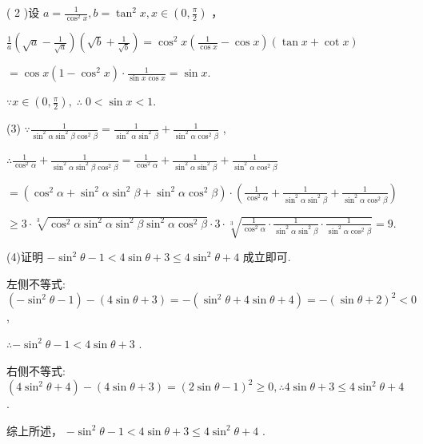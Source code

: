 \documentclass[10pt]{article}
\begin{document}
( 2 )设 \(a = \frac{1}{{\cos }^{2}x},b = {\tan }^{2}x,x \in  \left( {0,\frac{\pi }{2}}\right)\) ，

\(\frac{1}{a}\left( {\sqrt{a} - \frac{1}{\sqrt{a}}}\right) \left( {\sqrt{b} + \frac{1}{\sqrt{b}}}\right)  = {\cos }^{2}x\left( {\frac{1}{\cos x} - \cos x}\right) \left( {\tan x + \cot x}\right)\)

\(= \cos x\left( {1 - {\cos }^{2}x}\right)  \cdot  \frac{1}{\sin x\cos x} = \sin x.\)

\(\because x \in  \left( {0,\frac{\pi }{2}}\right) ,\;\therefore \;0 < \sin x < 1.\)

(3) \(\because \frac{1}{{\sin }^{2}\alpha {\sin }^{2}\beta {\cos }^{2}\beta } = \frac{1}{{\sin }^{2}\alpha {\sin }^{2}\beta } + \frac{1}{{\sin }^{2}\alpha {\cos }^{2}\beta }\) ,

\(\therefore \frac{1}{{\cos }^{2}\alpha } + \frac{1}{{\sin }^{2}\alpha {\sin }^{2}\beta {\cos }^{2}\beta } = \frac{1}{{\cos }^{2}\alpha } + \frac{1}{{\sin }^{2}\alpha {\sin }^{2}\beta } + \frac{1}{{\sin }^{2}\alpha {\cos }^{2}\beta }\)

\(= \left( {{\cos }^{2}\alpha  + {\sin }^{2}\alpha {\sin }^{2}\beta  + {\sin }^{2}\alpha {\cos }^{2}\beta }\right)  \cdot  \left( {\frac{1}{{\cos }^{2}\alpha } + \frac{1}{{\sin }^{2}\alpha {\sin }^{2}\beta } + \frac{1}{{\sin }^{2}\alpha {\cos }^{2}\beta }}\right)\)

\(\geq  3 \cdot  \sqrt[3]{{\cos }^{2}\alpha {\sin }^{2}\alpha {\sin }^{2}\beta {\sin }^{2}\alpha {\cos }^{2}\beta } \cdot  3 \cdot  \sqrt[3]{\frac{1}{{\cos }^{2}\alpha } \cdot  \frac{1}{{\sin }^{2}\alpha {\sin }^{2}\beta } \cdot  \frac{1}{{\sin }^{2}\alpha {\cos }^{2}\beta }} = 9.\)

(4)证明 \(- {\sin }^{2}\theta  - 1 < 4\sin \theta  + 3 \leq  4{\sin }^{2}\theta  + 4\) 成立即可.

左侧不等式: \(\left( {-{\sin }^{2}\theta  - 1}\right)  - \left( {4\sin \theta  + 3}\right)  =  - \left( {{\sin }^{2}\theta  + 4\sin \theta  + 4}\right)  =  - {\left( \sin \theta  + 2\right) }^{2} < 0\) ,

\(\therefore  - {\sin }^{2}\theta  - 1 < 4\sin \theta  + 3\) .

右侧不等式: \(\left( {4{\sin }^{2}\theta  + 4}\right)  - \left( {4\sin \theta  + 3}\right)  = {\left( 2\sin \theta  - 1\right) }^{2} \geq  0,\therefore 4\sin \theta  + 3 \leq  4{\sin }^{2}\theta  + 4\) .

综上所述， \(- {\sin }^{2}\theta  - 1 < 4\sin \theta  + 3 \leq  4{\sin }^{2}\theta  + 4\) .
\end{document}
